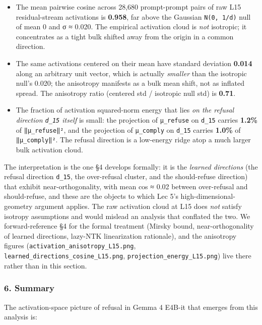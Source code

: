 \documentclass[
  11pt,
]{article}
\providecommand{\tightlist}{%
  \setlength{\itemsep}{0pt}\setlength{\parskip}{0pt}}
\begin{document}
\begin{itemize}
\tightlist
\item
  The mean pairwise cosine across 28,680 prompt-prompt pairs of raw L15
  residual-stream activations is \textbf{0.958}, far above the Gaussian
  \texttt{N(0,\ 1/d)} null of mean 0 and σ ≈ 0.020. The empirical
  activation cloud is \emph{not} isotropic; it concentrates as a tight
  bulk shifted away from the origin in a common direction.
\item
  The same activations centered on their mean have standard deviation
  \textbf{0.014} along an arbitrary unit vector, which is actually
  \emph{smaller} than the isotropic null's 0.020; the anisotropy
  manifests as a bulk mean shift, not as inflated spread. The anisotropy
  ratio (centered std / isotropic null std) is \textbf{0.71}.
\item
  The fraction of activation squared-norm energy that lies \emph{on the
  refusal direction \texttt{d\_15} itself} is small: the projection of
  \texttt{μ\_refuse} on \texttt{d\_15} carries \textbf{1.2\%} of
  \texttt{‖μ\_refuse‖²}, and the projection of \texttt{μ\_comply} on
  \texttt{d\_15} carries \textbf{1.0\%} of \texttt{‖μ\_comply‖²}. The
  refusal direction is a low-energy ridge atop a much larger bulk
  activation cloud.
\end{itemize}

The interpretation is the one §4 develops formally: it is the
\emph{learned directions} (the refusal direction \texttt{d\_15}, the
over-refusal cluster, and the should-refuse direction) that exhibit
near-orthogonality, with mean \textbar cos\textbar{} ≈ 0.02 between
over-refusal and should-refuse, and these are the objects to which Lec
5's high-dimensional-geometry argument applies. The raw activation cloud
at L15 does \emph{not} satisfy isotropy assumptions and would mislead an
analysis that conflated the two. We forward-reference §4 for the formal
treatment (Mirsky bound, near-orthogonality of learned directions,
lazy-NTK linearization rationale), and the anisotropy figures
(\texttt{activation\_anisotropy\_L15.png},
\texttt{learned\_directions\_cosine\_L15.png},
\texttt{projection\_energy\_L15.png}) live there rather than in this
section.

\subsubsection{6. Summary}\label{summary}

The activation-space picture of refusal in Gemma 4 E4B-it that emerges
from this analysis is:
\end{document}
